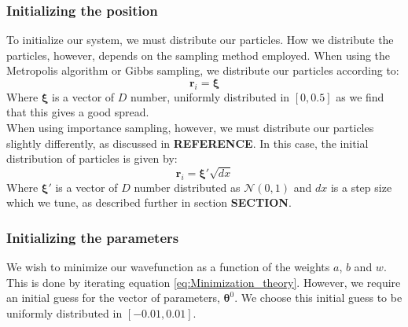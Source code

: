 \documentclass[a4paper, 10pt]{article}
\begin{document}
	\subsubsection{Initializing the position}
	To initialize our system, we must distribute our particles. How we distribute the particles, however, depends on the sampling method employed. When using the Metropolis algorithm or Gibbs sampling, we distribute our particles according to:
	\begin{equation}
	\boldsymbol{r}_i=\boldsymbol{\xi}
	\end{equation}
	Where $\boldsymbol{\xi}$ is a vector of $D$ number, uniformly distributed in $[0,0.5]$ as we find that this gives a good spread.\\
	\linebreak
	When using importance sampling, however, we must distribute our particles slightly differently, as discussed in \textbf{REFERENCE}. In this case, the initial distribution of particles is given by:
	\begin{equation}
	\boldsymbol{r}_i=\boldsymbol{\xi'}\sqrt{dx}
	\end{equation}
	Where $\boldsymbol{\xi'}$ is a vector of $D$ number distributed as $\mathcal{N}(0,1)$ and $dx$ is a step size which we tune, as described further in section \textbf{SECTION}.
	\subsubsection{Initializing the parameters}
	We wish to minimize our wavefunction as a function of the weights $a$, $b$ and $w$. This is done by iterating equation \ref{eq:Minimization_theory}. However, we require an initial guess for the vector of parameters, $\boldsymbol{\theta}^0$. We choose this initial guess to be uniformly distributed in $[-0.01, 0.01]$.
\end{document}
